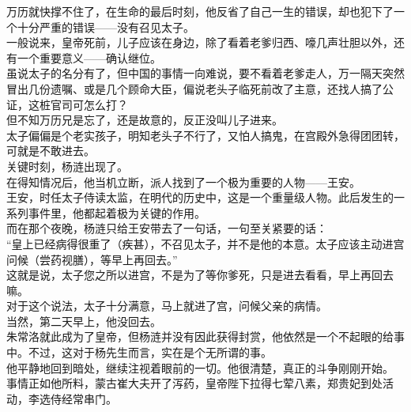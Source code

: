 \begin{multicols}{\theparacolNo}
万历就快撑不住了，在生命的最后时刻，他反省了自己一生的错误，却也犯下了一个十分严重的错误——没有召见太子。\\

一般说来，皇帝死前，儿子应该在身边，除了看着老爹归西、嚎几声壮胆以外，还有一个重要意义——确认继位。\\

虽说太子的名分有了，但中国的事情一向难说，要不看着老爹走人，万一隔天突然冒出几份遗嘱、或是几个顾命大臣，偏说老头子临死前改了主意，还找人搞了公证，这桩官司可怎么打？\\

但不知万历兄是忘了，还是故意的，反正没叫儿子进来。\\

太子偏偏是个老实孩子，明知老头子不行了，又怕人搞鬼，在宫殿外急得团团转，可就是不敢进去。\\

关键时刻，杨涟出现了。\\

在得知情况后，他当机立断，派人找到了一个极为重要的人物——王安。\\

王安，时任太子侍读太监，在明代的历史中，这是一个重量级人物。此后发生的一系列事件里，他都起着极为关键的作用。\\

而在那个夜晚，杨涟只给王安带去了一句话，一句至关紧要的话：\\

“皇上已经病得很重了（疾甚），不召见太子，并不是他的本意。太子应该主动进宫问候（尝药视膳），等早上再回去。”\\

这就是说，太子您之所以进宫，不是为了等你爹死，只是进去看看，早上再回去嘛。\\

对于这个说法，太子十分满意，马上就进了宫，问候父亲的病情。\\

当然，第二天早上，他没回去。\\

朱常洛就此成为了皇帝，但杨涟并没有因此获得封赏，他依然是一个不起眼的给事中。不过，这对于杨先生而言，实在是个无所谓的事。\\

他平静地回到暗处，继续注视着眼前的一切。他很清楚，真正的斗争刚刚开始。\\

事情正如他所料，蒙古崔大夫开了泻药，皇帝陛下拉得七荤八素，郑贵妃到处活动，李选侍经常串门。\\


\end{multicols}
